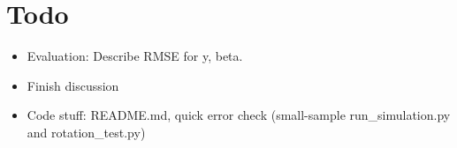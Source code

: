 \section{Todo}
\begin{itemize}
    \item Evaluation: Describe RMSE for y, beta.
    \item Finish discussion
    \item Code stuff: README.md, quick error check (small-sample run\_simulation.py and rotation\_test.py)
\end{itemize}
